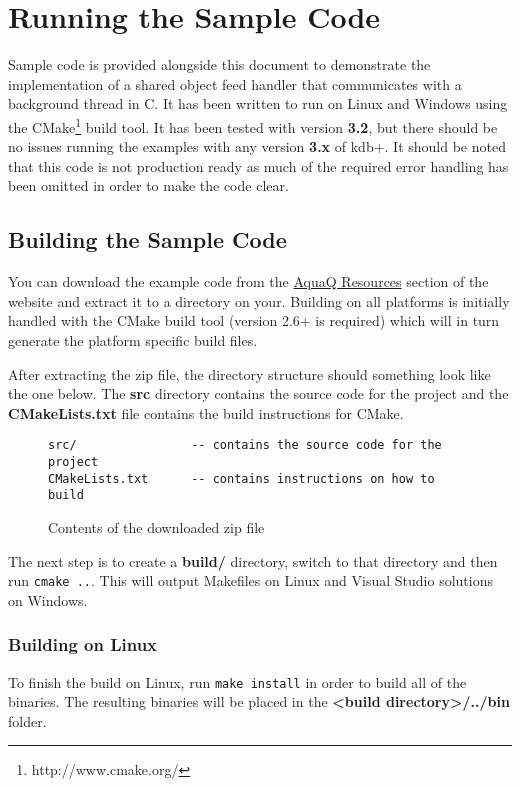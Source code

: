 \chapter{Running the Sample Code}

Sample code is provided alongside this document to demonstrate the implementation of a shared object feed handler that
communicates with a background thread in C. It has been written to run on Linux and Windows using the CMake\footnote{http://www.cmake.org/}
build tool. It has been tested with version \textbf{3.2}, but there should be no issues running the examples with any
version \textbf{3.x} of kdb+. It should be noted that this code is not production ready as much of the required error
handling has been omitted in order to make the code clear.

\section{Building the Sample Code}

You can download the example code from the \href{http://www.aquaq.co.uk/resource}{AquaQ Resources} section of the website
and extract it to a directory on your. Building on all platforms is initially handled with the CMake build tool (version 2.6+
is required) which will in turn generate the platform specific build files.

After extracting the zip file, the directory structure should something look like the one below. The \textbf{src} directory
contains the source code for the project and the \textbf{CMakeLists.txt} file contains the build instructions for CMake.

\begin{figure}
\begin{lstlisting}
src/				-- contains the source code for the project
CMakeLists.txt		-- contains instructions on how to build
\end{lstlisting}
\caption{Contents of the downloaded zip file}
\end{figure}

The next step is to create a \textbf{build/} directory, switch to that directory and then run \verb|cmake ..|. This will output
Makefiles on Linux and Visual Studio solutions on Windows.

\subsection{Building on Linux}

To finish the build on Linux, run \verb|make install| in order to build all of the binaries. The resulting binaries will be placed
in the \textbf{<build directory>/../bin} folder.

